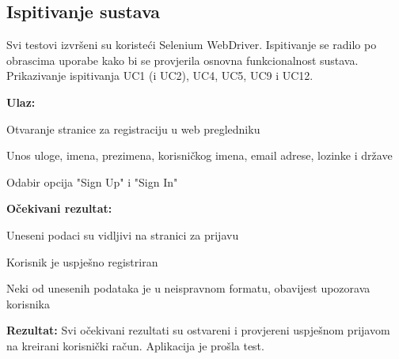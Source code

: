 			\subsection{Ispitivanje sustava}
			Svi testovi izvršeni su koristeći Selenium WebDriver. Ispitivanje se radilo po obrascima uporabe kako bi se provjerila osnovna funkcionalnost sustava. Prikazivanje ispitivanja UC1 (i UC2), UC4, UC5, UC9 i UC12.
			
			\noindent {}
			\begin{packed_item}

				\item  \textbf{Ulaz:}
				\item[] \begin{packed_enum}

					\item Otvaranje stranice za registraciju u web pregledniku
					\item Unos uloge, imena, prezimena, korisničkog imena, email adrese, lozinke i države
					\item Odabir opcija "Sign Up" i "Sign In"

				\end{packed_enum}
				
				\item  \textbf{Očekivani rezultat:}
				\item[] \begin{packed_item}
				\item[1] Uneseni podaci su vidljivi na stranici za prijavu
				\item[2.a] Korisnik je uspješno registriran
				\item[2.b] Neki od unesenih podataka je u neispravnom formatu, obavijest upozorava korisnika
				\end{packed_item}

				\item  \textbf{Rezultat:} Svi očekivani rezultati su ostvareni i provjereni uspješnom prijavom na kreirani korisnički račun. Aplikacija je prošla test.
			\end{packed_item}

